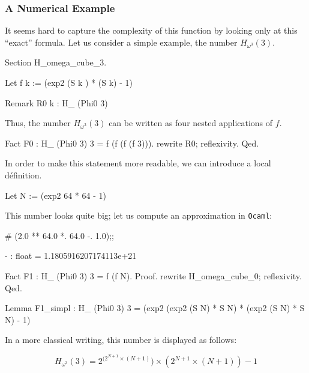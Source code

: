 \subsubsection{A Numerical Example}

It seems hard to capture the complexity of this function by looking only at this
``exact'' formula. 
Let us consider a simple example, the number $H_{\omega^3}(3)$.  

\begin{Coqsrc}
Section H_omega_cube_3.
  
Let f k :=   (exp2 (S k ) * (S k) - 1)%

Remark R0 k :  H_ (Phi0 3)%
\end{Coqsrc}

Thus, the number $H_{\omega^3}(3)$ can be written as four nested applications of $f$.

\begin{Coqsrc}
Fact F0 : H_ (Phi0 3) 3 = f (f (f (f 3))).
 rewrite R0; reflexivity. 
Qed.
\end{Coqsrc}

In order to make this statement more readable, we can introduce a local définition.

\begin{Coqsrc}
Let N := (exp2 64 * 64 - 1)%
\end{Coqsrc}

This number looks quite big; let us compute an approximation in \texttt{Ocaml}:


\begin{Coqsrc}
# (2.0 ** 64.0 *. 64.0 -. 1.0);; 
\end{Coqsrc}

\begin{Coqanswer}
- : float = 1.1805916207174113e+21
\end{Coqanswer}


\begin{Coqsrc}
Fact F1 : H_ (Phi0 3) 3 = f (f N).
Proof.
 rewrite H_omega_cube_0; reflexivity. 
Qed.


Lemma F1_simpl : H_ (Phi0 3) 3 =
                 (exp2 (exp2 (S N) * S N) * (exp2 (S N) * S N) - 1)%

\end{Coqsrc}


In a more classical writing, this number is displayed as follows:

{\Large
$$
H_{\omega^3}(3) =  2 ^ {(2 ^ {N + 1} \times (N+1) } )  \times  (2 ^ {N+1} \times ( N +1) ) - 1
$$
}


